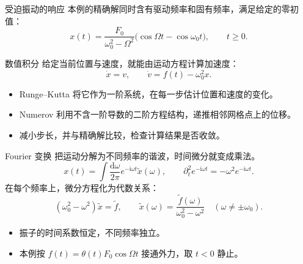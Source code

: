 \documentclass[aspectratio=169,11pt]{beamer}
\newcommand{\dd}{\mathrm d}
\newcommand{\ii}{\mathrm i}
\begin{document}
\begin{frame}{受迫振动的响应}
本例的精确解同时含有驱动频率和固有频率，满足给定的零初值：
\[
x(t)=\frac{F_0}{\omega_0^2-\Omega^2}
\bigl(\cos\Omega t-\cos\omega_0t\bigr),\qquad t\ge0.
\]
\begin{center}
\end{center}
\end{frame}

\begin{frame}{数值积分}
给定当前位置与速度，就能由运动方程计算加速度：
\[
\dot x=v,\qquad \dot v=f(t)-\omega_0^2x.
\]
\begin{itemize}
\item Runge--Kutta 将它作为一阶系统，在每一步估计位置和速度的变化。
\item Numerov 利用不含一阶导数的二阶方程结构，递推相邻网格点上的位移。
\item 减小步长，并与精确解比较，检查计算结果是否收敛。
\end{itemize}
\end{frame}

\begin{frame}{Fourier 变换}
把运动分解为不同频率的谐波，时间微分就变成乘法。
\[
x(t)=\int\frac{\dd\omega}{2\pi}e^{-\ii\omega t}\widetilde x(\omega),
\qquad \partial_t^2 e^{-\ii\omega t}=-\omega^2e^{-\ii\omega t}.
\]
在每个频率上，微分方程化为代数关系：
\[
(\omega_0^2-\omega^2)\widetilde x=\widetilde f,
\qquad
\widetilde x(\omega)=\frac{\widetilde f(\omega)}{\omega_0^2-\omega^2}
\quad(\omega\ne\pm\omega_0).
\]
\begin{itemize}
\item 振子的时间系数恒定，不同频率独立。
\item 本例按 $f(t)=\theta(t)F_0\cos\Omega t$ 接通外力，取 $t<0$ 静止。
\end{itemize}
\end{frame}
\end{document}
